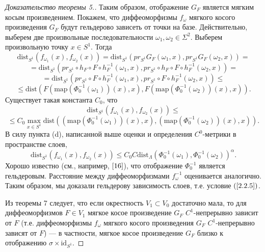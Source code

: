 \documentclass[12pt]{article}
\begin{document}
\begin{proof}[Доказательство теоремы 5.]
Таким образом, отображение $G_F$ является мягким косым произведением. Покажем, что диффеоморфизмы $f_{\omega}$ мягкого косого произведения $G_F$ будут гельдерово зависеть от точки на ба\nobreak зе. Действительно, выберем две произвольные последовательности $\omega_1,\omega_2\in\Sigma^2$. Выберем произвольную точку $x\in S^1$. 
Тогда
$$\textrm{dist}_{S^1}(f_{\omega_1}(x),f_{\omega_2}(x))=\textrm{dist}_{S^1}(pr_{S^1}G_F(\omega_1,x), pr_{S^1}G_F(\omega_2,x))=$$
$$=\textrm{dist}_{S^1}(pr_{S^1}\circ h_F\circ F\circ h^{-1}_F(\omega_1,x),pr_{S^1}\circ h_F\circ F\circ h^{-1}_F(\omega_2,x))=$$
$$=\textrm{dist}_{S^1}(pr_{S^1}\circ F\circ h^{-1}_F(\omega_1,x),pr_{S^1}\circ F\circ h^{-1}_F(\omega_2,x))\leq$$
$$\leq\textrm{dist}\left(F\left(\textrm{map}(\Phi_0^{-1}(\omega_1))(x),x\right),F\left(\textrm{map}(\Phi_0^{-1}(\omega_2))(x),x\right)\right).$$
Существует такая константа $C_{0}$, что
$$\textrm{dist}_{S^1}(f_{\omega_1}(x),f_{\omega_2}(x))\leq$$
$$\leq C_{0}\max_{x\in S^1}\textrm{dist}\left(\left(\textrm{map}(\Phi_0^{-1}(\omega_1))(x),x\right),\left(\textrm{map}(\Phi_0^{-1}(\omega_2))(x),x\right)\right).$$
В силу пункта (d), написанной выше оценки и определения $C^0$-метрики в пространстве слоев,
$$\textrm{dist}_{S^1}(f_{\omega_1}(x),f_{\omega_2}(x))\leq C_{0}C\textrm{dist}_{\Lambda}\left(\Phi_0^{-1}(\omega_1),\Phi_0^{-1}(\omega_2)\right)^{\alpha}.$$
Хорошо известно (см., например, $\cite{16}$), что отображение $\Phi_0^{-1}$ является гельдеровым. %
Расстояние между диффеоморфизмами $f^{-1}_{\omega}$ оценивается аналогично. 
Таким образом, мы доказали гельдерову зависимость слоев, т.е. условие $(\ref{2.2.5})$.

Из теоремы 7 следует, что если окрестность $V_1\subset V_0$ достаточно мала, то для диффеоморфизмов $F\in V_1$ мягкое косое произведение $G_F$ $C^1$-непрерывно зависит от $F$ (т.е. диффеоморфизмы $f_{\omega}$ мягкого косого произведения $G_F$ $C^1$-непрерывно зависят от $F$) --- в частности, мягкое косое произведение $G_F$ близко к  отображению $\sigma\times\mbox{id}_{S^1}$.


\end{proof}
\end{document}

